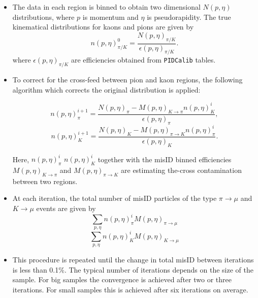 \begin {itemize}
\begin{itemize}

\item The data in each region is binned to obtain two dimensional $N(p, \eta)$ distributions, where $p$ is momentum and $\eta$ is pseudorapidity. The true kinematical distributions for kaons and pions are given by
\begin{equation}
n(p, \eta )^{0}_{\pi/K} = \frac{N(p, \eta )_{\pi/K}}{\epsilon(p,\eta )_{\pi/K}}.
\end{equation}
where $\epsilon(p,\eta)_{\pi/K}$ are efficiencies obtained from \texttt{PIDCalib} tables.

\item To correct for the cross-feed between pion and kaon regions, the following algorithm which corrects the original distribution is applied:

\begin{equation}
n(p, \eta)^{i+1}_{\pi}=\frac{N(p, \eta)_{\pi}-M(p, \eta)_{K \rightarrow \pi} n(p, \eta)^{i}_{K}}{\epsilon(p,\eta)_{\pi}},
\end{equation}
\begin{equation}
n(p, \eta)^{i+1}_{K}=\frac{N(p, \eta)_{K}-M(p, \eta)_{\pi \rightarrow K} n(p, \eta)^{i}_{\pi}}{\epsilon(p,\eta)_{K}}.
\end{equation}

Here, $n(p, \eta)^{i}_{\pi}$  $n(p, \eta)^{i}_{K}$ together with the misID binned efficiencies $M(p, \eta )_{K \rightarrow \pi}$ and $M(p, \eta)_{\pi \rightarrow K}$ are estimating the-cross contamination between two regions.


\item At each iteration, the total number of misID particles of the type $\pi \rightarrow \mu$ and $K \rightarrow \mu$ events are given by
\begin{equation}
\sum_{p,\eta} n(p, \eta)^{i}_{\pi} M(p, \eta)_{\pi\rightarrow\mu} 
\end{equation}
\begin{equation}
\sum_{p,\eta} n(p, \eta)^{i}_{K} M(p, \eta)_{K\rightarrow\mu}
\end{equation}
\item This procedure is repeated until the change in total misID between iterations is less than 0.1\%. The typical number of iterations depends on the size of the sample. For big samples the convergence is achieved after two or three iterations. For small samples this is achieved after six iterations on average.


\end{itemize}
\end{itemize}

